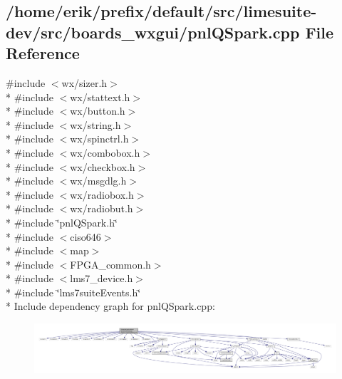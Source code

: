 \subsection{/home/erik/prefix/default/src/limesuite-\/dev/src/boards\+\_\+wxgui/pnl\+Q\+Spark.cpp File Reference}
\label{pnlQSpark_8cpp}
{\ttfamily \#include $<$wx/sizer.\+h$>$}\\*
{\ttfamily \#include $<$wx/stattext.\+h$>$}\\*
{\ttfamily \#include $<$wx/button.\+h$>$}\\*
{\ttfamily \#include $<$wx/string.\+h$>$}\\*
{\ttfamily \#include $<$wx/spinctrl.\+h$>$}\\*
{\ttfamily \#include $<$wx/combobox.\+h$>$}\\*
{\ttfamily \#include $<$wx/checkbox.\+h$>$}\\*
{\ttfamily \#include $<$wx/msgdlg.\+h$>$}\\*
{\ttfamily \#include $<$wx/radiobox.\+h$>$}\\*
{\ttfamily \#include $<$wx/radiobut.\+h$>$}\\*
{\ttfamily \#include \char`\"{}pnl\+Q\+Spark.\+h\char`\"{}}\\*
{\ttfamily \#include $<$ciso646$>$}\\*
{\ttfamily \#include $<$map$>$}\\*
{\ttfamily \#include $<$F\+P\+G\+A\+\_\+common.\+h$>$}\\*
{\ttfamily \#include $<$lms7\+\_\+device.\+h$>$}\\*
{\ttfamily \#include \char`\"{}lms7suite\+Events.\+h\char`\"{}}\\*
Include dependency graph for pnl\+Q\+Spark.\+cpp\+:
\nopagebreak
\begin{figure}[H]
\begin{center}
\leavevmode
\includegraphics[width=350pt]{d8/de6/pnlQSpark_8cpp__incl}
\end{center}
\end{figure}
